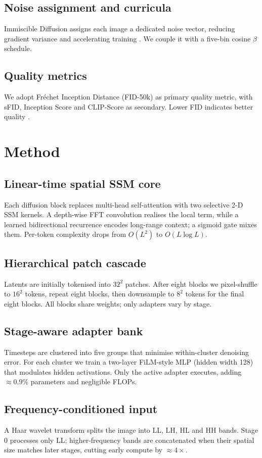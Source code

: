 \documentclass{article}
\begin{document}
\subsection{Noise assignment and curricula}
Immiscible Diffusion assigns each image a dedicated noise vector, reducing gradient variance and accelerating training \cite{li-2024-immiscible}. We couple it with a five-bin cosine $\beta$ schedule.

\subsection{Quality metrics}
We adopt Fréchet Inception Distance (FID-50k) as primary quality metric, with sFID, Inception Score and CLIP-Score as secondary. Lower FID indicates better quality \cite{heusel-2017-gans}.

\section{Method}
\subsection{Linear-time spatial SSM core}
Each diffusion block replaces multi-head self-attention with two selective 2-D SSM kernels. A depth-wise FFT convolution realises the local term, while a learned bidirectional recurrence encodes long-range context; a sigmoid gate mixes them. Per-token complexity drops from $O(L^2)$ to $O(L\log L)$.

\subsection{Hierarchical patch cascade}
Latents are initially tokenised into $32^2$ patches. After eight blocks we pixel-shuffle to $16^2$ tokens, repeat eight blocks, then downsample to $8^2$ tokens for the final eight blocks. All blocks share weights; only adapters vary by stage.

\subsection{Stage-aware adapter bank}
Timesteps are clustered into five groups that minimise within-cluster denoising error. For each cluster we train a two-layer FiLM-style MLP (hidden width 128) that modulates hidden activations. Only the active adapter executes, adding $\approx 0.9$\% parameters and negligible FLOPs.

\subsection{Frequency-conditioned input}
A Haar wavelet transform splits the image into LL, LH, HL and HH bands. Stage 0 processes only LL; higher-frequency bands are concatenated when their spatial size matches later stages, cutting early compute by $\approx 4\times$.
\end{document}
